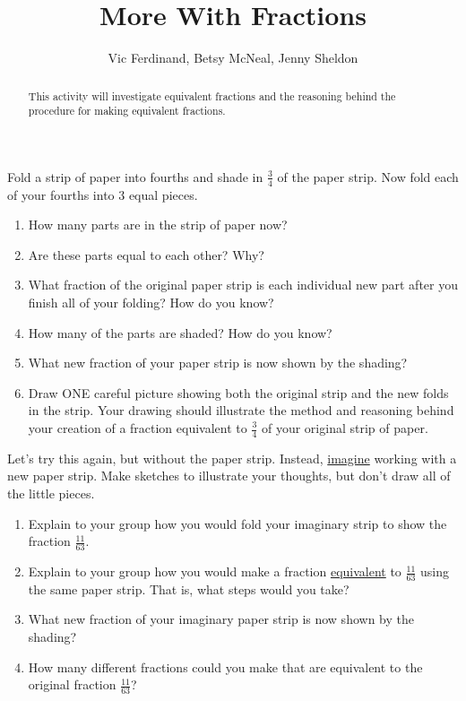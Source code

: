 \documentclass[nooutcomes,noauthor,handout]{ximera}
\title{More With Fractions}
\author{Vic Ferdinand, Betsy McNeal, Jenny Sheldon}
\begin{document}
\begin{abstract}
 This activity will investigate equivalent fractions and the reasoning behind the procedure for making equivalent fractions. %
\end{abstract}
\maketitle



\begin{problem} \label{MoreWithFractions1}
Fold a strip of paper into fourths and shade in $\frac{3}{4}$ of the paper strip. Now fold each of your fourths into 3 equal pieces.  
\begin{enumerate}
    \item   How many parts are in the strip of paper now?
    \item   Are these parts equal to each other?  Why?
    \item   What fraction of the original paper strip is each individual new part after you finish all of your folding? How do you know?
    \item   How many of the parts are shaded?  How do you know?
    \item   What new fraction of your paper strip is now shown by the shading?  
    \item Draw ONE careful picture showing both the original strip and the new folds in the strip.  Your drawing should illustrate the method and reasoning behind your creation of a fraction equivalent to $\frac{3}{4}$ of your original strip of paper.
   
\end{enumerate}
\end{problem}

\pagebreak

\begin{problem} \label{MoreWithFractions2}
 Let's try this again, but without the paper strip.  Instead, \underline{imagine} working with a new paper strip. Make sketches to illustrate your thoughts, but don't draw all of the little pieces.  
\begin{enumerate}
    \item Explain to your group how you would fold your imaginary strip to show the fraction $\frac{11}{63}$.   
    \item Explain to your group how you would make a fraction  \underline{equivalent} to $\frac{11}{63}$ using the same paper strip.  That is, what steps would you take?
   
    \item   What new fraction of your imaginary paper strip is now shown by the shading?  
    
    \item How many different fractions could you make that are equivalent to the original fraction $\frac{11}{63}$?
   
\end{enumerate}
\end{problem}
\vskip 1in
\end{document}
